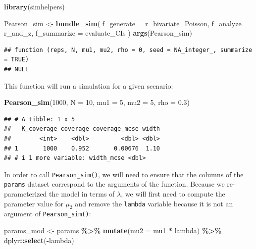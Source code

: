 \documentclass[
]{book}
\newenvironment{Shaded}{\begin{snugshade}}{\end{snugshade}}
\newcommand{\AttributeTok}[1]{\textcolor[rgb]{0.13,0.29,0.53}{#1}}
\newcommand{\DecValTok}[1]{\textcolor[rgb]{0.00,0.00,0.81}{#1}}
\newcommand{\FloatTok}[1]{\textcolor[rgb]{0.00,0.00,0.81}{#1}}
\newcommand{\FunctionTok}[1]{\textcolor[rgb]{0.13,0.29,0.53}{\textbf{#1}}}
\newcommand{\NormalTok}[1]{#1}
\newcommand{\OtherTok}[1]{\textcolor[rgb]{0.56,0.35,0.01}{#1}}
\newcommand{\SpecialCharTok}[1]{\textcolor[rgb]{0.81,0.36,0.00}{\textbf{#1}}}
\begin{document}
\begin{Shaded}
\begin{Highlighting}[]
\FunctionTok{library}\NormalTok{(simhelpers)}

\NormalTok{Pearson\_sim }\OtherTok{\textless{}{-}} \FunctionTok{bundle\_sim}\NormalTok{(}
  \AttributeTok{f\_generate =}\NormalTok{ r\_bivariate\_Poisson, }\AttributeTok{f\_analyze =}\NormalTok{ r\_and\_z, }\AttributeTok{f\_summarize =}\NormalTok{ evaluate\_CIs}
\NormalTok{)}
\FunctionTok{args}\NormalTok{(Pearson\_sim)}
\end{Highlighting}
\end{Shaded}

\begin{verbatim}
## function (reps, N, mu1, mu2, rho = 0, seed = NA_integer_, summarize = TRUE) 
## NULL
\end{verbatim}

This function will run a simulation for a given scenario:

\begin{Shaded}
\begin{Highlighting}[]
\FunctionTok{Pearson\_sim}\NormalTok{(}\DecValTok{1000}\NormalTok{, }\AttributeTok{N =} \DecValTok{10}\NormalTok{, }\AttributeTok{mu1 =} \DecValTok{5}\NormalTok{, }\AttributeTok{mu2 =} \DecValTok{5}\NormalTok{, }\AttributeTok{rho =} \FloatTok{0.3}\NormalTok{)}
\end{Highlighting}
\end{Shaded}

\begin{verbatim}
## # A tibble: 1 x 5
##   K_coverage coverage coverage_mcse width
##        <int>    <dbl>         <dbl> <dbl>
## 1       1000    0.952       0.00676  1.10
## # i 1 more variable: width_mcse <dbl>
\end{verbatim}

In order to call \texttt{Pearson\_sim()}, we will need to ensure that the columns of the \texttt{params} dataset correspond to the arguments of the function.
Because we re-parameterized the model in terms of \(\lambda\), we will first need to compute the parameter value for \(\mu_2\) and remove the \texttt{lambda} variable because it is not an argument of \texttt{Pearson\_sim()}:

\begin{Shaded}
\begin{Highlighting}[]
\NormalTok{params\_mod }\OtherTok{\textless{}{-}} 
\NormalTok{  params }\SpecialCharTok{\%\textgreater{}\%}
  \FunctionTok{mutate}\NormalTok{(}\AttributeTok{mu2 =}\NormalTok{ mu1 }\SpecialCharTok{*}\NormalTok{ lambda) }\SpecialCharTok{\%\textgreater{}\%}
\NormalTok{  dplyr}\SpecialCharTok{::}\FunctionTok{select}\NormalTok{(}\SpecialCharTok{{-}}\NormalTok{lambda)}
\end{Highlighting}
\end{Shaded}
\end{document}
